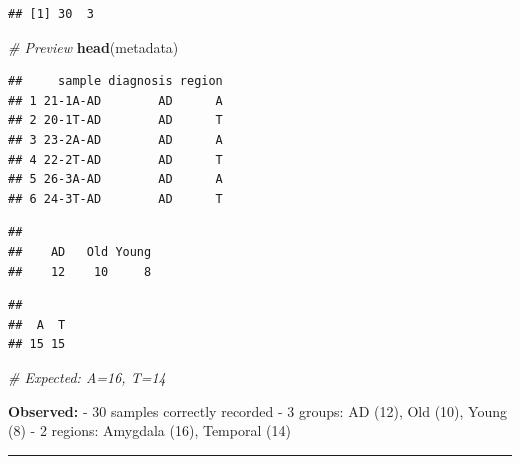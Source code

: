 \documentclass[
]{article}
\newenvironment{Shaded}{\begin{snugshade}}{\end{snugshade}}
\newcommand{\CommentTok}[1]{\textcolor[rgb]{0.56,0.35,0.01}{\textit{#1}}}
\newcommand{\FunctionTok}[1]{\textcolor[rgb]{0.13,0.29,0.53}{\textbf{#1}}}
\newcommand{\NormalTok}[1]{#1}
\newcommand{\SpecialCharTok}[1]{\textcolor[rgb]{0.81,0.36,0.00}{\textbf{#1}}}
\begin{document}
\begin{verbatim}
## [1] 30  3
\end{verbatim}

\begin{Shaded}
\begin{Highlighting}[]
\CommentTok{\# Preview}
\FunctionTok{head}\NormalTok{(metadata)}
\end{Highlighting}
\end{Shaded}

\begin{verbatim}
##     sample diagnosis region
## 1 21-1A-AD        AD      A
## 2 20-1T-AD        AD      T
## 3 23-2A-AD        AD      A
## 4 22-2T-AD        AD      T
## 5 26-3A-AD        AD      A
## 6 24-3T-AD        AD      T
\end{verbatim}

\begin{Shaded}
\end{Shaded}

\begin{verbatim}
## 
##    AD   Old Young 
##    12    10     8
\end{verbatim}

\begin{Shaded}
\end{Shaded}

\begin{verbatim}
## 
##  A  T 
## 15 15
\end{verbatim}

\begin{Shaded}
\begin{Highlighting}[]
\CommentTok{\# Expected: A=16, T=14}
\end{Highlighting}
\end{Shaded}

\textbf{Observed:} - 30 samples correctly recorded - 3 groups: AD (12),
Old (10), Young (8) - 2 regions: Amygdala (16), Temporal (14)

\begin{center}\rule{0.5\linewidth}{0.5pt}\end{center}
\end{document}

